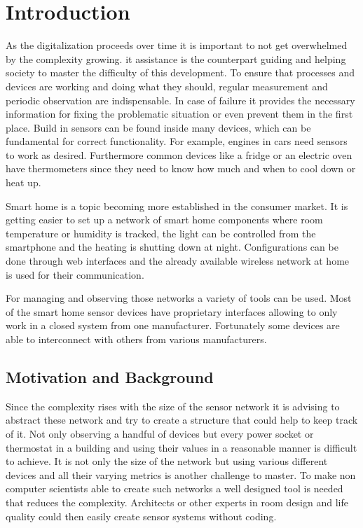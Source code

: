 \chapter{Introduction}
As the digitalization proceeds over time it is important to not get overwhelmed by the complexity growing. \gls{it} assistance is the counterpart guiding and helping society to master the difficulty of this development. To ensure that processes and devices are working and doing what they should, regular measurement and periodic observation are indispensable. In case of failure it provides the necessary information for fixing the problematic situation or even prevent them in the first place. Build in sensors can be found inside many devices, which can be fundamental for correct functionality. For example, engines in cars need sensors to work as desired. Furthermore common devices like a fridge or an electric oven have thermometers since they need to know how much and when to cool down or heat up. 

Smart home is a topic becoming more established in the consumer market. It is getting easier to set up a network of smart home components where room temperature or humidity is tracked, the light can be controlled from the smartphone and the heating is shutting down at night. Configurations can be done through web interfaces and the already available wireless network at home is used for their communication.

For managing and observing those networks a variety of tools can be used. Most of the smart home sensor devices have proprietary interfaces allowing to only work in a closed system from one manufacturer. Fortunately some devices are able to interconnect with others from various manufacturers. 

\section{Motivation and Background}
Since the complexity rises with the size of the sensor network it is advising to abstract these network and try to create a structure that could help to keep track of it. Not only observing a handful of devices but every power socket or thermostat in a building and using their values in a reasonable manner is difficult to achieve. It is not only the size of the network but using various different devices and all their varying metrics is another challenge to master. To make non computer scientists able to create such networks a well designed tool is needed that reduces the complexity. Architects or other experts in room design and life quality could then easily create sensor systems without coding.

